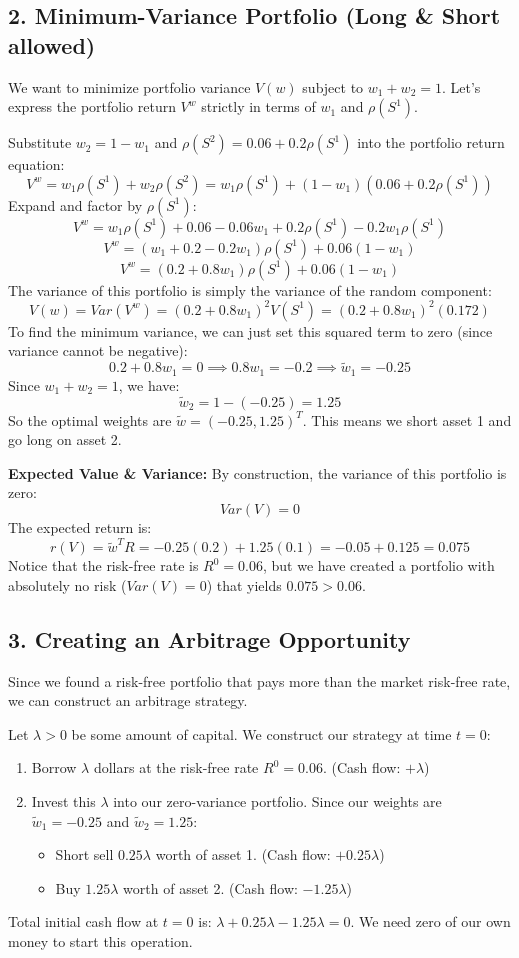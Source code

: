 \subsection*{2. Minimum-Variance Portfolio (Long \& Short allowed)}
We want to minimize portfolio variance $V(w)$ subject to $w_1 + w_2 = 1$. Let's express the portfolio return $V^w$ strictly in terms of $w_1$ and $\rho(S^1)$.

Substitute $w_2 = 1 - w_1$ and $\rho(S^2) = 0.06 + 0.2\rho(S^1)$ into the portfolio return equation:
\[
V^w = w_1\rho(S^1) + w_2\rho(S^2) = w_1\rho(S^1) + (1 - w_1)(0.06 + 0.2\rho(S^1))
\]
Expand and factor by $\rho(S^1)$:
\[
V^w = w_1\rho(S^1) + 0.06 - 0.06w_1 + 0.2\rho(S^1) - 0.2w_1\rho(S^1)
\]
\[
V^w = (w_1 + 0.2 - 0.2w_1)\rho(S^1) + 0.06(1 - w_1)
\]
\[
V^w = (0.2 + 0.8w_1)\rho(S^1) + 0.06(1 - w_1)
\]
The variance of this portfolio is simply the variance of the random component:
\[
V(w) = Var(V^w) = (0.2 + 0.8w_1)^2 V(S^1) = (0.2 + 0.8w_1)^2 (0.172)
\]
To find the minimum variance, we can just set this squared term to zero (since variance cannot be negative):
\[
0.2 + 0.8w_1 = 0 \implies 0.8w_1 = -0.2 \implies \tilde{w}_1 = -0.25
\]
Since $w_1 + w_2 = 1$, we have:
\[
\tilde{w}_2 = 1 - (-0.25) = 1.25
\]
So the optimal weights are $\tilde{w} = (-0.25, 1.25)^T$. This means we short asset 1 and go long on asset 2.

\vspace{0.5em}
\noindent \textbf{Expected Value \& Variance:}
By construction, the variance of this portfolio is zero:
\[
Var(V) = 0
\]
The expected return is:
\[
r(V) = \tilde{w}^T R = -0.25(0.2) + 1.25(0.1) = -0.05 + 0.125 = 0.075
\]
Notice that the risk-free rate is $R^0 = 0.06$, but we have created a portfolio with absolutely no risk ($Var(V) = 0$) that yields $0.075 > 0.06$. 

\subsection*{3. Creating an Arbitrage Opportunity}
Since we found a risk-free portfolio that pays more than the market risk-free rate, we can construct an arbitrage strategy.

Let $\lambda > 0$ be some amount of capital. We construct our strategy at time $t=0$:
\begin{enumerate}
    \item Borrow $\lambda$ dollars at the risk-free rate $R^0 = 0.06$. (Cash flow: $+\lambda$)
    \item Invest this $\lambda$ into our zero-variance portfolio. Since our weights are $\tilde{w}_1 = -0.25$ and $\tilde{w}_2 = 1.25$:
    \begin{itemize}
        \item Short sell $0.25\lambda$ worth of asset 1. (Cash flow: $+0.25\lambda$)
        \item Buy $1.25\lambda$ worth of asset 2. (Cash flow: $-1.25\lambda$)
    \end{itemize}
\end{enumerate}
Total initial cash flow at $t=0$ is: $\lambda + 0.25\lambda - 1.25\lambda = 0$. We need zero of our own money to start this operation.

